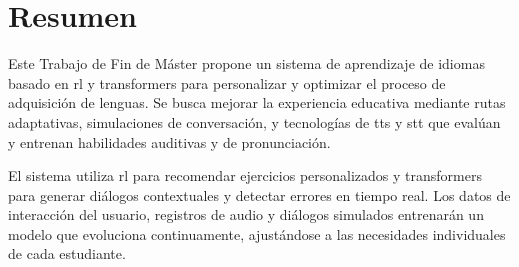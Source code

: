 \chapter*{Resumen}
\label{resumen}


Este Trabajo de Fin de Máster propone un sistema de aprendizaje de idiomas basado en \gls{rl} y \gls{transformers} para personalizar y optimizar el proceso de adquisición de lenguas. Se busca mejorar la experiencia educativa mediante rutas adaptativas, simulaciones de conversación, y tecnologías de \acrlong{tts} y \acrlong{stt} que evalúan y entrenan habilidades auditivas y de pronunciación.

El sistema utiliza \gls{rl} para recomendar ejercicios personalizados y \gls{transformers} para generar diálogos contextuales y detectar errores en tiempo real. Los datos de interacción del usuario, registros de audio y diálogos simulados entrenarán un modelo que evoluciona continuamente, ajustándose a las necesidades individuales de cada estudiante.
